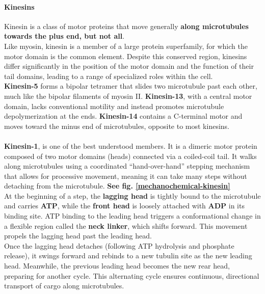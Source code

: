 \documentclass[../main.tex]{subfiles}
\begin{document}
\paragraph{Kinesins}
Kinesin is a class of motor proteins that move generally \textbf{along microtubules towards the plus end, but not all}. \\
\indent Like myosin, \gls{kinesin} is a member of a large protein superfamily, for which the motor domain is the common element. Despite this conserved region, kinesins differ significantly in the position of the motor domain and the function of their tail domains, leading to a range of specialized roles within the cell.\\
\indent \textbf{Kinesin-5} forms a bipolar tetramer that slides two microtubule past each other, much like the bipolar filaments of myosin II. \textbf{Kinesin-13}, with a central motor domain, lacks conventional motility and instead promotes microtubule depolymerization at the ends. \textbf{Kinesin-14} contains a C-terminal motor and moves toward the minus end of microtubules, opposite to most kinesins.\\
\\
\textbf{Kinesin-1}, is one of the best understood members. It is a dimeric motor protein composed of two motor domains (heads) connected via a coiled-coil tail. It walks along microtubules using a coordinated “hand-over-hand” stepping mechanism that allows for processive movement, meaning it can take many steps without detaching from the microtubule. \textbf{See fig. \ref{mechanochemical-kinesin}} \\
\indent At the beginning of a step, the \textbf{lagging head} is tightly bound to the microtubule and carries \textbf{ATP}, while the \textbf{front head} is loosely attached with \textbf{ADP} in its binding site. ATP binding to the leading head triggers a conformational change in a flexible region called the \textbf{neck linker}, which shifts forward. This movement propels the lagging head past the leading head.\\
\indent Once the lagging head detaches (following ATP hydrolysis and phosphate release), it swings forward and rebinds to a new tubulin site as the new leading head. Meanwhile, the previous leading head becomes the new rear head, preparing for another cycle. This alternating cycle ensures continuous, directional transport of cargo along microtubules.
\end{document}
